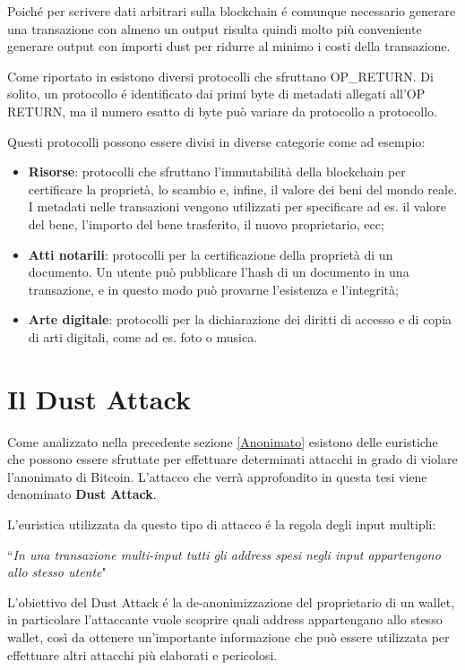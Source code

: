 Poiché per scrivere dati arbitrari sulla blockchain é comunque necessario generare una transazione con almeno un output risulta quindi molto più conveniente generare output con importi dust per ridurre al minimo i costi della transazione.

Come riportato in \cite{OP_RETURN} esistono diversi protocolli che sfruttano OP\_RETURN. Di solito, un protocollo é identificato dai primi byte di metadati allegati all'OP RETURN, ma il numero esatto di byte può variare da protocollo a protocollo. 

Questi protocolli possono essere divisi in diverse categorie come ad esempio:
\begin{itemize}
    \item \textbf{Risorse}: protocolli che sfruttano l'immutabilità della blockchain per certificare la proprietà, lo scambio e, infine, il valore dei beni del mondo reale. I metadati nelle transazioni vengono utilizzati per specificare ad es. il valore del bene, l'importo del bene trasferito, il nuovo proprietario, ecc;  
    \item \textbf{Atti notarili}: protocolli per la certificazione della proprietà di un documento. Un utente può pubblicare l'hash di un documento in una transazione, e in questo modo può provarne l'esistenza e l'integrità;
    \item \textbf{Arte digitale}: protocolli per la dichiarazione dei diritti di accesso e di copia di arti digitali, come ad es. foto o musica.
\end{itemize}

\section{Il Dust Attack}\label{dstatt}
Come analizzato nella precedente sezione \ref{Anonimato} esistono delle euristiche che possono essere sfruttate per effettuare determinati attacchi in grado di violare l'anonimato di Bitcoin. L'attacco che verrà approfondito in questa tesi viene denominato \textbf{Dust Attack}. 

L'euristica utilizzata da questo tipo di attacco é la regola degli input multipli:
\begin{center}
    ``\textit{In una transazione multi-input tutti gli address spesi negli input appartengono allo stesso utente}"
\end{center}
L'obiettivo del Dust Attack é la de-anonimizzazione del proprietario di un wallet, in particolare l'attaccante vuole scoprire quali address appartengano allo stesso wallet, così da ottenere un'importante informazione che può essere utilizzata per effettuare altri attacchi più elaborati e pericolosi.


